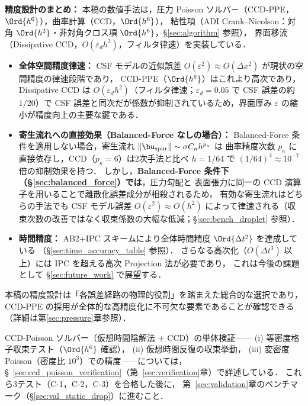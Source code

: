 \noindent\textbf{精度設計のまとめ：}
\label{sec:accuracy_summary}
本稿の数値手法は，圧力 Poisson ソルバー（CCD-PPE，$\Ord{h^6}$），曲率計算（CCD，$\Ord{h^6}$），
粘性項（ADI Crank--Nicolson：対角 $\Ord{h^2}$・非対角クロス項 $\Ord{h^6}$，§\ref{sec:algorithm} 参照），
界面移流（Dissipative CCD，$O(\varepsilon_d h^2)$，フィルタ律速）を実装している．

\begin{itemize}[noitemsep]
  \item \textbf{全体空間精度律速：} CSF モデルの近似誤差 $O(\varepsilon^2) \approx O(\Delta x^2)$ が現状の空間精度の律速段階であり，
        CCD-PPE（$\Ord{h^6}$）はこれより高次であり，Dissipative CCD は $O(\varepsilon_d h^2)$（フィルタ律速；$\varepsilon_d=0.05$ で CSF 誤差の約 $1/20$）で CSF 誤差と同次だが係数が抑制されているため，界面厚み $\varepsilon$ の縮小が精度向上の主要な鍵である．
  \item \textbf{寄生流れへの直接効果（Balanced-Force なしの場合）：}
        Balanced-Force 条件を適用しない場合，寄生流れ $\|\bu_{\text{spur}}\| \sim \sigma C_\kappa h^{p_\kappa}$ は
        曲率精度次数 $p_\kappa$ に直接依存し，CCD（$p_\kappa=6$）は2次手法と比べ
        $h=1/64$ で $(1/64)^4 \approx 10^{-7}$ 倍の抑制効果を持つ．
        しかし，\textbf{Balanced-Force 条件下（§\ref{sec:balanced_force}）では}，圧力勾配と
        表面張力に同一の CCD 演算子を用いることで離散化誤差成分が相殺されるため，
        有効な寄生流れはどちらの手法でも CSF モデル誤差 $O(\varepsilon^2) \approx O(h^2)$
        によって律速される（収束次数の改善ではなく収束係数の大幅な低減；§\ref{sec:bench_droplet} 参照）．
  \item \textbf{時間精度：} AB2+IPC スキームにより全体時間精度 $\Ord{\Delta t^2}$ を達成している
        （§\ref{sec:time_accuracy_table} 参照）．
        さらなる高次化（$O(\Delta t^3)$ 以上）には IPC を超える高次 Projection 法が必要であり，
        これは今後の課題として §\ref{sec:future_work} で展望する．
\end{itemize}
本稿の精度設計は「各誤差経路の物理的役割」を踏まえた総合的な選択であり，
CCD-PPE の採用が全体的な高精度化に不可欠な要素であることが確認できる（詳細は第\ref{sec:pressure}章参照）．

\noindent CCD-Poisson ソルバー（仮想時間陰解法 + CCD）の単体検証——
(i) 等密度格子収束テスト（$\Ord{h^6}$ 確認），
(ii) 仮想時間反復の収束挙動，
(iii) 変密度 Poisson（密度比 $10^3$）での精度——については，
§~\ref{sec:ccd_poisson_verification}（第~\ref{sec:verification}章）で詳述している．
これら3テスト（C-1，C-2，C-3）を合格した後に，
第~\ref{sec:validation}章のベンチマーク（§\ref{sec:val_static_drop}）に進むこと．
